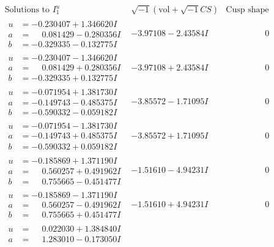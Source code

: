 \documentclass[1p]{elsarticle_modified}
\theoremstyle{definition}
\newcommand{\I}{\sqrt{-1}}
\begin{document}
$$\begin{array}{c|c|c}
\text{Solutions to }I^u_{1}& \I (\text{vol} + \sqrt{-1}CS) & \text{Cusp shape}\\
 \hline 
\begin{aligned}
u &= -0.230407 + 1.346620 I \\
a &= \phantom{-}0.081429 - 0.280356 I \\
b &= -0.329335 - 0.132775 I\end{aligned}
 & -3.97108 - 2.43584 I & \phantom{-0.000000 } 0 \\ \hline\begin{aligned}
u &= -0.230407 - 1.346620 I \\
a &= \phantom{-}0.081429 + 0.280356 I \\
b &= -0.329335 + 0.132775 I\end{aligned}
 & -3.97108 + 2.43584 I & \phantom{-0.000000 } 0 \\ \hline\begin{aligned}
u &= -0.071954 + 1.381730 I \\
a &= -0.149743 - 0.485375 I \\
b &= -0.590332 - 0.059182 I\end{aligned}
 & -3.85572 - 1.71095 I & \phantom{-0.000000 } 0 \\ \hline\begin{aligned}
u &= -0.071954 - 1.381730 I \\
a &= -0.149743 + 0.485375 I \\
b &= -0.590332 + 0.059182 I\end{aligned}
 & -3.85572 + 1.71095 I & \phantom{-0.000000 } 0 \\ \hline\begin{aligned}
u &= -0.185869 + 1.371190 I \\
a &= \phantom{-}0.560257 + 0.491962 I \\
b &= \phantom{-}0.755665 - 0.451477 I\end{aligned}
 & -1.51610 - 4.94231 I & \phantom{-0.000000 } 0 \\ \hline\begin{aligned}
u &= -0.185869 - 1.371190 I \\
a &= \phantom{-}0.560257 - 0.491962 I \\
b &= \phantom{-}0.755665 + 0.451477 I\end{aligned}
 & -1.51610 + 4.94231 I & \phantom{-0.000000 } 0 \\ \hline\begin{aligned}
u &= \phantom{-}0.022030 + 1.384840 I \\
a &= \phantom{-}1.283010 - 0.173050 I \\

\end{aligned}
\end{array}$$
\end{document}
